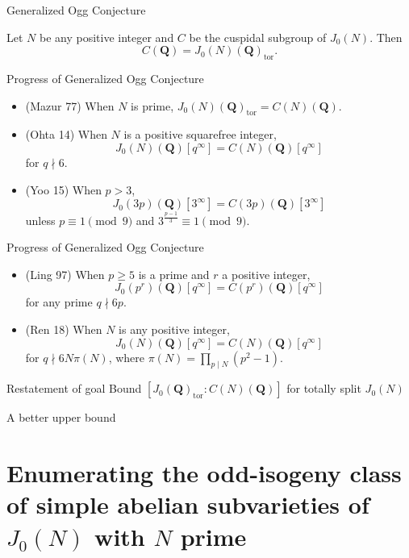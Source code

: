 \documentclass{beamer}
\newcommand{\QQ}{\mathbf{Q}}
\newcommand{\F}{\mathbf{F}}
\newcommand{\tor}{\mathrm{tor}}
\begin{document}
\begin{frame}{Generalized Ogg Conjecture}
    \begin{conjecture}
        Let $N$ be any positive integer and $C$ be the cuspidal subgroup of
        $J_0(N)$. Then
        \[
            C(\QQ) = J_0(N)(\QQ)_\tor.
        \]
    \end{conjecture}
\end{frame}

\begin{frame}{Progress of Generalized Ogg Conjecture}
    \begin{itemize}
        \item 
            (Mazur 77) When $N$ is prime, $J_0(N)(\QQ)_\tor =C(N)(\QQ)$.
            \pause
        \item
            (Ohta 14) When $N$ is a positive squarefree integer,
            \[
                J_0(N)(\QQ)[q^\infty]=C(N)(\QQ)[q^\infty]
            \]
            for $q\nmid 6$.
        \item
            (Yoo 15) When $p>3$,
            \[
                J_0(3p)(\QQ)[3^\infty] = C(3p)(\QQ)[3^\infty]
            \]
            unless $p\equiv 1 \pmod{9}$ and $3^{\frac{p-1}{3}} \equiv 1
            \pmod{9}$.
    \end{itemize}
\end{frame}

\begin{frame}{Progress of Generalized Ogg Conjecture}
    \begin{itemize}
        \item
            (Ling 97) When $p\geq 5$ is a prime and $r$ a positive integer,
            \[
                J_0(p^r)(\QQ)[q^\infty] = C(p^r)(\QQ)[q^\infty]
            \]
            for any prime $q\nmid 6p$.
        \item
            (Ren 18) When $N$ is any positive integer,
            \[
                J_0(N)(\QQ)[q^\infty]=C(N)(\QQ)[q^\infty]
            \]
            for $q\nmid 6N\pi(N)$, where $\pi(N) = \prod_{p\mid N}
            (p^2-1)$.
    \end{itemize}
\end{frame}

\begin{frame}{Restatement of goal}
    \large{Bound $[J_0(\QQ)_\tor:C(N)(\QQ)]$ for totally split $J_0(N)$}
\end{frame}

\begin{frame}{A better upper bound}
\end{frame}

\section{Enumerating the odd-isogeny class of simple abelian subvarieties of
$J_0(N)$ with $N$ prime}

    
\end{document}
